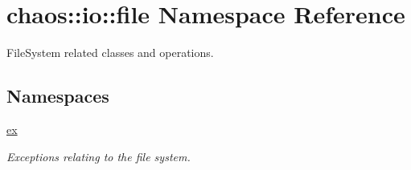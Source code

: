 \hypertarget{namespacechaos_1_1io_1_1file}{}\section{chaos\+:\+:io\+:\+:file Namespace Reference}
\label{namespacechaos_1_1io_1_1file}


File\+System related classes and operations.  


\subsection*{Namespaces}
\begin{DoxyCompactItemize}
\item 
 \hyperlink{namespacechaos_1_1io_1_1file_1_1ex}{ex}
\begin{DoxyCompactList}\small\item\em Exceptions relating to the file system. \end{DoxyCompactList}\end{DoxyCompactItemize}
